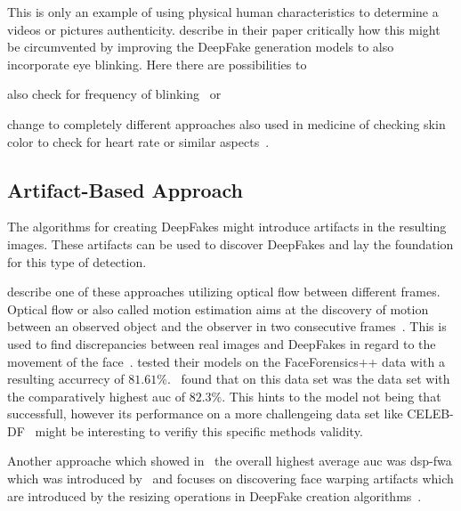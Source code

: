 \par
This is only an example of using physical human characteristics to determine a
videos or pictures authenticity. \textcite{li_ictu_2018} describe in 
their paper critically how this might be circumvented by improving the DeepFake
generation models to also incorporate eye blinking. Here there are possibilities
to 
\begin{enumerate*}[a.)]
    \item also check for frequency of blinking~\cite{li_ictu_2018} or
    \item change to completely different approaches also used in medicine of
    checking skin color to check for heart rate or similar aspects~\cite{pishori_detecting_2020}.
\end{enumerate*}

\subsection{Artifact-Based Approach}
The algorithms for creating DeepFakes might introduce artifacts in the resulting
images. These artifacts can be used to discover DeepFakes and lay the foundation
for this type of detection.

\par
\textcite{amerini_deepfake_2019} describe one of these approaches utilizing optical
flow between different frames.
Optical flow or also called motion estimation aims at the discovery of motion
between an observed object and the observer in two consecutive frames~\cite{beauchemin_computation_1995}.
This is used to find discrepancies between real images and DeepFakes in regard
to the movement of the face~\cite{amerini_deepfake_2019}.
\textcite{amerini_deepfake_2019} tested their models on the FaceForensics++ data
with a resulting accurrecy of \(81.61\%\).~\textcite{li_celeb-df_2019} found that
on this data set was the data set with the comparatively highest \gls{auc} of 
\(82.3\%\). This hints to the model not being that successfull, however its
performance on a more challengeing data set like CELEB-DF~\cite{li_celeb-df_2019}
might be interesting to verifiy this specific methods validity.

\par
Another approache which showed in~\cite{li_celeb-df_2019} the overall highest
average \gls{auc} was \gls{dsp-fwa} which was introduced by~\cite{he_spatial_2014}
and focuses on discovering face warping artifacts which are introduced by the 
resizing operations in DeepFake creation algorithms~\cite{li_celeb-df_2019,he_spatial_2014}.

